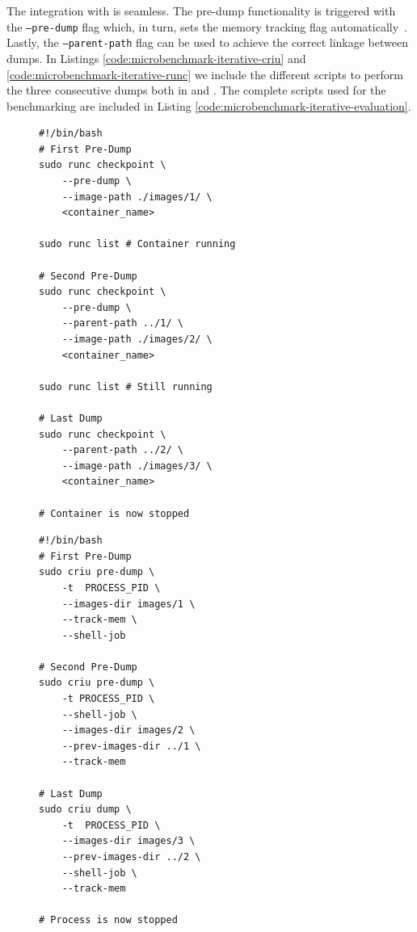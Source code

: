 The integration with \runc is seamless.
The pre-dump functionality is triggered with the \texttt{--pre-dump} flag which, in turn, sets the memory tracking flag automatically~\cite{runc-memtrack}.
Lastly, the \texttt{--parent-path} flag can be used to achieve the correct linkage between dumps.
In Listings \ref{code:microbenchmark-iterative-criu} and \ref{code:microbenchmark-iterative-runc} we include the different scripts to perform the three consecutive dumps both in \criu and \runc.
The complete scripts used for the benchmarking are included in Listing \ref{code:microbenchmark-iterative-evaluation}.
\begin{figure}[h!]
\begin{minipage}{.45\textwidth}
\begin{lstlisting}[style=Bash,caption={Scripts to perfrom two pre-dumps and a dump of a running process using CRIU.\label{code:microbenchmark-iterative-runc}}]
#!/bin/bash
# First Pre-Dump
sudo runc checkpoint \
    --pre-dump \
    --image-path ./images/1/ \
    <container_name>

sudo runc list # Container running

# Second Pre-Dump
sudo runc checkpoint \
    --pre-dump \
    --parent-path ../1/ \
    --image-path ./images/2/ \
    <container_name>

sudo runc list # Still running

# Last Dump
sudo runc checkpoint \
    --parent-path ../2/ \
    --image-path ./images/3/ \
    <container_name>

# Container is now stopped
\end{lstlisting}
\end{minipage}\hfill
\begin{minipage}{.45\textwidth}
\begin{lstlisting}[style=Bash,caption={Scripts to perfrom two pre-dumps and a dump of a running container using runC.\label{code:microbenchmark-iterative-criu}}]
#!/bin/bash
# First Pre-Dump
sudo criu pre-dump \
    -t  PROCESS_PID \
    --images-dir images/1 \
    --track-mem \
    --shell-job 

# Second Pre-Dump
sudo criu pre-dump \
    -t PROCESS_PID \
    --shell-job \
    --images-dir images/2 \
    --prev-images-dir ../1 \
    --track-mem

# Last Dump
sudo criu dump \
    -t  PROCESS_PID \
    --images-dir images/3 \
    --prev-images-dir ../2 \
    --shell-job \
    --track-mem

# Process is now stopped
\end{lstlisting}
\end{minipage}
\end{figure}

